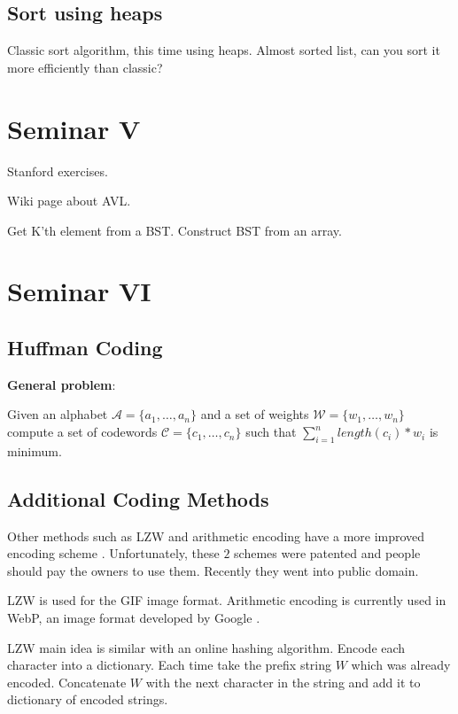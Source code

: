 \documentclass{llncs}
\begin{document}
\subsection{Sort using heaps}
Classic sort algorithm, this time using heaps. Almost sorted list, can you sort it more efficiently than classic?


\section{Seminar V}

Stanford exercises. \cite{website:stanford/binarytrees}

Wiki page about AVL. \cite{website:wiki:avl}

Get K'th element from a BST. Construct BST from an array.


\section{Seminar VI}

\subsection{Huffman Coding}

\textbf{General problem}:

Given an alphabet $\mathcal{A} = \{a_1, \dots, a_n\}$ and a set of weights $\mathcal{W} = \{w_1, \dots, w_n \}$ compute a set of codewords $\mathcal{C} = \{c_1, \dots, c_n \}$ such that $\sum\limits_{i=1}^n length(c_i) * w_i$ is minimum.


\subsection{Additional Coding Methods}

Other methods such as LZW and arithmetic encoding have a more improved encoding scheme \cite{website:wiki:arithmetic-encoding, website:wiki:LZW}. Unfortunately, these $2$ schemes were patented and people should pay the owners to use them. Recently they went into public domain.

LZW is used for the GIF image format. Arithmetic encoding is currently used in WebP, an image format developed by Google \cite{website:WebP}.

LZW main idea is similar with an online hashing algorithm. Encode each character into a dictionary. Each time take the prefix string $W$ which was already encoded. Concatenate $W$ with the next character in the string and add it to dictionary of encoded strings.
\end{document}
